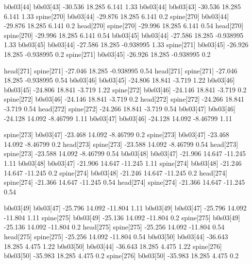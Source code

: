 b0s03[44]    b0s03[43]    -30.536    18.285    6.141    1.33
b0s03[44]    b0s03[43]    -30.536    18.285    6.141    1.33
spine[270]    b0s03[44]    -29.876    18.285    6.141    0.2
spine[270]    b0s03[44]    -29.876    18.285    6.141    0.2
head[270]    spine[270]    -29.996    18.285    6.141    0.54
head[270]    spine[270]    -29.996    18.285    6.141    0.54
b0s03[45]    b0s03[44]    -27.586    18.285    -0.938995    1.33
b0s03[45]    b0s03[44]    -27.586    18.285    -0.938995    1.33
spine[271]    b0s03[45]    -26.926    18.285    -0.938995    0.2
spine[271]    b0s03[45]    -26.926    18.285    -0.938995    0.2


head[271]    spine[271]    -27.046    18.285    -0.938995    0.54
head[271]    spine[271]    -27.046    18.285    -0.938995    0.54
b0s03[46]    b0s03[45]    -24.806    18.841    -3.719    1.22
b0s03[46]    b0s03[45]    -24.806    18.841    -3.719    1.22
spine[272]    b0s03[46]    -24.146    18.841    -3.719    0.2
spine[272]    b0s03[46]    -24.146    18.841    -3.719    0.2
head[272]    spine[272]    -24.266    18.841    -3.719    0.54
head[272]    spine[272]    -24.266    18.841    -3.719    0.54
b0s03[47]    b0s03[46]    -24.128    14.092    -8.46799    1.11
b0s03[47]    b0s03[46]    -24.128    14.092    -8.46799    1.11


spine[273]    b0s03[47]    -23.468    14.092    -8.46799    0.2
spine[273]    b0s03[47]    -23.468    14.092    -8.46799    0.2
head[273]    spine[273]    -23.588    14.092    -8.46799    0.54
head[273]    spine[273]    -23.588    14.092    -8.46799    0.54
b0s03[48]    b0s03[47]    -21.906    14.647    -11.245    1.11
b0s03[48]    b0s03[47]    -21.906    14.647    -11.245    1.11
spine[274]    b0s03[48]    -21.246    14.647    -11.245    0.2
spine[274]    b0s03[48]    -21.246    14.647    -11.245    0.2
head[274]    spine[274]    -21.366    14.647    -11.245    0.54
head[274]    spine[274]    -21.366    14.647    -11.245    0.54


b0s03[49]    b0s03[47]    -25.796    14.092    -11.804    1.11
b0s03[49]    b0s03[47]    -25.796    14.092    -11.804    1.11
spine[275]    b0s03[49]    -25.136    14.092    -11.804    0.2
spine[275]    b0s03[49]    -25.136    14.092    -11.804    0.2
head[275]    spine[275]    -25.256    14.092    -11.804    0.54
head[275]    spine[275]    -25.256    14.092    -11.804    0.54
b0s03[50]    b0s03[44]    -36.643    18.285    4.475    1.22
b0s03[50]    b0s03[44]    -36.643    18.285    4.475    1.22
spine[276]    b0s03[50]    -35.983    18.285    4.475    0.2
spine[276]    b0s03[50]    -35.983    18.285    4.475    0.2


